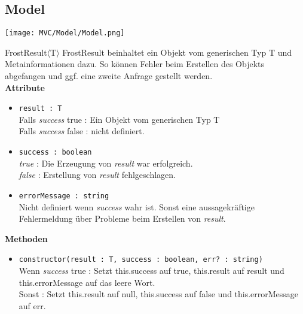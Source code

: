 \subsection{Model}

\texttt{[image: MVC/Model/Model.png]}
\newpage

    \begin{Class}{FrostResult$\langle$T$\rangle$}
        FrostResult beinhaltet ein Objekt vom generischen Typ T und Metainformationen dazu.
        So können Fehler beim Erstellen des Objekts abgefangen und ggf. eine zweite Anfrage gestellt werden.
        \bigskip\\
        \textbf{Attribute}
        \begin{itemize}
            \item \texttt{result : T}
            \\ Falls \emph{success} true : Ein Objekt vom generischen Typ T
            \\ Falls \emph{success} false : nicht definiert.
            \item \texttt{success : boolean}
            \\ \emph{true} : Die Erzeugung von \emph{result} war erfolgreich.
            \\ \emph{false} : Erstellung von \emph{result} fehlgeschlagen.
            \item \texttt{errorMessage : string}
            \\ Nicht definiert wenn \emph{success} wahr ist.
            Sonst eine aussagekräftige Fehlermeldung über Probleme beim Erstellen von \emph{result}.
        \end{itemize}

        \textbf{Methoden}
        \begin{itemize}
            \item \texttt{constructor(result : T, success : boolean, err? : string)}
            \\ Wenn \emph{success} true : Setzt this.success auf true,  this.result auf result und this.errorMessage auf das leere Wort.
            \\ Sonst : Setzt this.result auf null, this.success auf false und this.errorMessage auf err.
        \end{itemize}
    \end{Class}

